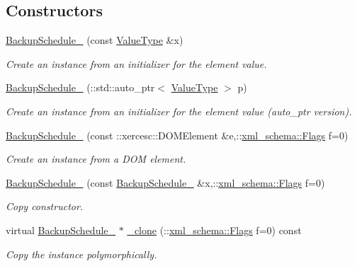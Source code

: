 \subsection*{Constructors}
\begin{DoxyCompactItemize}
\item 
\hyperlink{classopenstack_1_1xml_1_1BackupSchedule___a5d1b337718e6fa5531ca74f31a2bd7b1}{BackupSchedule\_\-} (const \hyperlink{classopenstack_1_1xml_1_1BackupSchedule}{ValueType} \&x)
\begin{DoxyCompactList}\small\item\em Create an instance from an initializer for the element value. \item\end{DoxyCompactList}\item 
\hyperlink{classopenstack_1_1xml_1_1BackupSchedule___acb2a0199b2e3cd61fc64f4b2290a7cf6}{BackupSchedule\_\-} (::std::auto\_\-ptr$<$ \hyperlink{classopenstack_1_1xml_1_1BackupSchedule}{ValueType} $>$ p)
\begin{DoxyCompactList}\small\item\em Create an instance from an initializer for the element value (auto\_\-ptr version). \item\end{DoxyCompactList}\item 
\hyperlink{classopenstack_1_1xml_1_1BackupSchedule___a900f7fea9b2651a3313facd94eb33293}{BackupSchedule\_\-} (const ::xercesc::DOMElement \&e,::\hyperlink{namespacexml__schema_affb4c227cbd9aa7453dd1dc5a1401943}{xml\_\-schema::Flags} f=0)
\begin{DoxyCompactList}\small\item\em Create an instance from a DOM element. \item\end{DoxyCompactList}\item 
\hyperlink{classopenstack_1_1xml_1_1BackupSchedule___a52c922575a355ec2023399b474161985}{BackupSchedule\_\-} (const \hyperlink{classopenstack_1_1xml_1_1BackupSchedule__}{BackupSchedule\_\-} \&x,::\hyperlink{namespacexml__schema_affb4c227cbd9aa7453dd1dc5a1401943}{xml\_\-schema::Flags} f=0)
\begin{DoxyCompactList}\small\item\em Copy constructor. \item\end{DoxyCompactList}\item 
virtual \hyperlink{classopenstack_1_1xml_1_1BackupSchedule__}{BackupSchedule\_\-} $\ast$ \hyperlink{classopenstack_1_1xml_1_1BackupSchedule___a38532d7c14198667e3a0a813de88584e}{\_\-clone} (::\hyperlink{namespacexml__schema_affb4c227cbd9aa7453dd1dc5a1401943}{xml\_\-schema::Flags} f=0) const 
\begin{DoxyCompactList}\small\item\em Copy the instance polymorphically. \item\end{DoxyCompactList}\end{DoxyCompactItemize}
